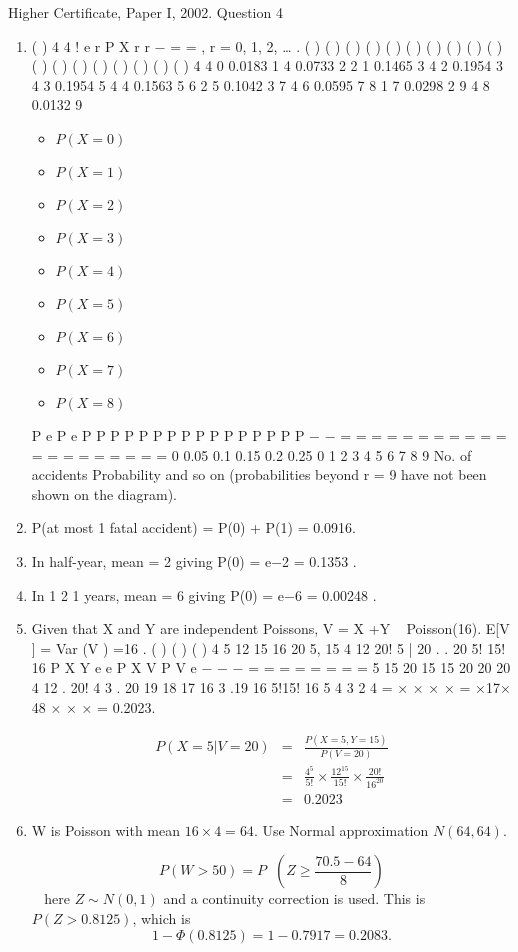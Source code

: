 \documentclass[a4paper,12pt]{article}
\begin{document}
Higher Certificate, Paper I, 2002. Question 4
\begin{enumerate}
\item ( )
4 4
!
e r P X r
r
−
= = , r = 0, 1, 2, … .
( )
( )
( ) ( )
( ) ( )
( ) ( )
( ) ( )
( ) ( )
( ) ( )
( ) ( )
( ) ( )
4
4
0 0.0183
1 4 0.0733
2 2 1 0.1465
3 4 2 0.1954
3
4 3 0.1954
5 4 4 0.1563
5
6 2 5 0.1042
3
7 4 6 0.0595
7
8 1 7 0.0298
2
9 4 8 0.0132
9

\begin{itemize}
    \item $P(X=0)$
    \item $P(X=1)$
    \item $P(X=2)$
    \item $P(X=3)$
    \item $P(X=4)$
    \item $P(X=5)$
    \item $P(X=6)$
    \item $P(X=7)$
    \item $P(X=8)$
\end{itemize}

P e
P e
P P
P P
P P
P P
P P
P P
P P
P P
−
−
= =
= =
= =
= =
= =
= =
= =
= =
= =
= =
0
0.05
0.1
0.15
0.2
0.25
0 1 2 3 4 5 6 7 8 9
No. of accidents
Probability
and so on (probabilities beyond r = 9 have not been shown on the diagram).
\item P(at most 1 fatal accident) = P(0) + P(1) = 0.0916.
\item In half-year, mean = 2 giving P(0) = e−2 = 0.1353 .
\item In 1
2 1 years, mean = 6 giving P(0) = e−6 = 0.00248 .
\item  Given that X and Y are independent Poissons, V = X +Y ~ Poisson(16).
E[V ] = Var (V ) =16 .
( ) ( )
( )
4 5 12 15
16 20
5, 15 4 12 20! 5 | 20 . .
20 5! 15! 16
P X Y e e P X V
P V e
− −
−
= =
= = = =
=
=
5 15 20 15 15
20 20 20
4 12 . 20! 4 3 . 20 19 18 17 16 3 .19
16 5!15! 16 5 4 3 2 4
= × × × × = ×17× 48
× × ×
= 0.2023.

\begin{eqnarray*}
P(X=5|V=20) &=& \frac{P(X=5,Y=15)}{P(V=20)}\\
&=& \frac{4^5}{5!} \times \frac{12^{15}}{15!} \times \frac{20!}{16^{20}}\\
&=& 0.2023
\end{eqnarray*}

\item  W is Poisson with mean $16 \times 4 = 64$. Use Normal approximation $N(64, 64)$.

\[P( W > 50) = P\left( Z \geq \frac{70.5-64}{8}\right)\] 
here $Z \sim N(0,1)$ and a continuity correction is
used. This is $P(Z > 0.8125)$, which is \[1-\Phi(0.8125) =1− 0.7917 = 0.2083.\]
\end{enumerate}
\end{document}
